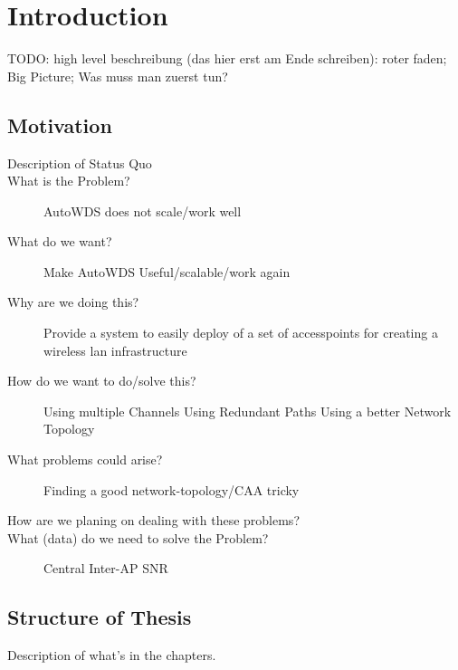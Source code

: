 \chapter{Introduction}
TODO: high level beschreibung (das hier erst am Ende schreiben): roter faden; Big Picture; Was muss man zuerst tun?
\section{Motivation}
\begin{description}
\item[Description of Status Quo]
\item[What is the Problem?]
AutoWDS does not scale/work well
\item[What do we want?]
Make AutoWDS Useful/scalable/work again
\item[Why are we doing this?]
Provide a system to easily deploy of a set of accesspoints for creating a wireless lan infrastructure
\item[How do we want to do/solve this?]
Using multiple Channels
Using Redundant Paths Using a better Network Topology
\item[What problems could arise?]
Finding a good network-topology/CAA tricky
\item[How are we planing on dealing with these problems?]
\item[What (data) do we need to solve the Problem?]
Central Inter-AP SNR
\end{description}

\section{Structure of Thesis}
Description of what's in the chapters.
